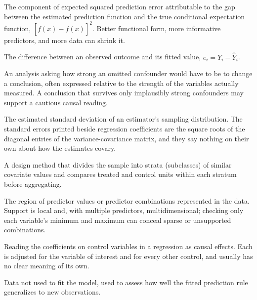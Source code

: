 \documentclass[11pt]{report}
\begin{document}
\begin{description}[style=nextline,leftmargin=0pt,labelindent=0pt,font=\bfseries]
\item[Reducible error] The component of expected squared prediction error attributable to the gap between the estimated prediction function and the true conditional expectation function, \([f(x)-\widehat{f}(x)]^2\). Better functional form, more informative predictors, and more data can shrink it.

\item[Residual] The difference between an observed outcome and its fitted value, \(e_i=Y_i-\widehat{Y}_i\).

\item[Sensitivity analysis] An analysis asking how strong an omitted confounder would have to be to change a conclusion, often expressed relative to the strength of the variables actually measured. A conclusion that survives only implausibly strong confounders may support a cautious causal reading.

\item[Standard error] The estimated standard deviation of an estimator's sampling distribution. The standard errors printed beside regression coefficients are the square roots of the diagonal entries of the variance-covariance matrix, and they say nothing on their own about how the estimates covary.

\item[Subclassification] A design method that divides the sample into strata (subclasses) of similar covariate values and compares treated and control units within each stratum before aggregating.

\item[Support] The region of predictor values or predictor combinations represented in the data. Support is local and, with multiple predictors, multidimensional; checking only each variable's minimum and maximum can conceal sparse or unsupported combinations.

\item[Table 2 fallacy] Reading the coefficients on control variables in a regression as causal effects. Each is adjusted for the variable of interest and for every other control, and usually has no clear meaning of its own.

\item[Test set] Data not used to fit the model, used to assess how well the fitted prediction rule generalizes to new observations.


\end{description}
\end{document}
